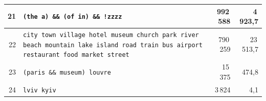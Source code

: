 \begin{longtable}{|r|p{}|r|r|}
\hline
21 & \texttt{(the \textbar{}\textbar{} a) \&\& (of \textbar{}\textbar{} in) \&\& !zzzz} & 992\,588 & 4\,923,7 \\
\hline
22 & \texttt{city \textbar{}\textbar{} town \textbar{}\textbar{} village \textbar{}\textbar{} hotel \textbar{}\textbar{} museum \textbar{}\textbar{} church \textbar{}\textbar{} park \textbar{}\textbar{} river \textbar{}\textbar{} beach \textbar{}\textbar{} mountain \textbar{}\textbar{} lake \textbar{}\textbar{} island \textbar{}\textbar{} road \textbar{}\textbar{} train \textbar{}\textbar{} bus \textbar{}\textbar{} airport \textbar{}\textbar{} restaurant \textbar{}\textbar{} food \textbar{}\textbar{} market \textbar{}\textbar{} street} & 790\,259 & 23\,513,7 \\
\hline
23 & \texttt{(paris \&\& museum) \textbar{}\textbar{} louvre} & 15\,375 & 474,8 \\
\hline
24 & \texttt{lviv \textbar{}\textbar{} kyiv} & 3\,824 & 4,1 \\
\hline
\end{longtable}
